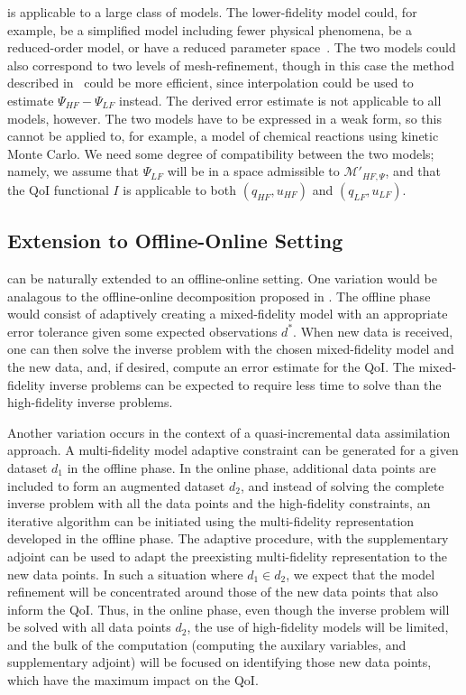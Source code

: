  is applicable to a large class of models. The lower-fidelity model could, for example, be a simplified model including fewer physical phenomena, be a reduced-order model, or have a reduced parameter space~\cite{thesis/SIAM talk?}. The two models could also correspond to two levels of mesh-refinement, though in this case the method described in~\cite{BecVex05} could be more efficient, since interpolation could be used to estimate $\Psi_{HF}-\Psi_{LF}$ instead. The derived error estimate is not applicable to all models, however. The two models have to be expressed in a weak form, so this cannot be applied to, for example, a model of chemical reactions using kinetic Monte Carlo. We need some degree of compatibility between the two models; namely, we assume that $\Psi_{LF}$ will be in a space admissible to $\mathcal{M}'_{HF,\Psi}$, and that the QoI functional $I$ is applicable to both $(q_{HF},u_{HF})$ and $(q_{LF},u_{LF})$.

\subsection{Extension to Offline-Online Setting}\label{sec:onoff}

 can be naturally extended to an offline-online setting. One variation would be analagous to the offline-online decomposition proposed in \cite{LiebWill13}. The offline phase would consist of adaptively creating a mixed-fidelity model with an appropriate error tolerance given some expected observations $d^*$. When new data is received, one can then solve the inverse problem with the chosen mixed-fidelity model and the new data, and, if desired, compute an error estimate for the QoI. The mixed-fidelity inverse problems can be expected to require less time to solve than the high-fidelity inverse problems.

Another variation occurs in the context of a quasi-incremental data assimilation approach. A multi-fidelity model adaptive constraint can be generated for a given dataset $d_1$ in the offline phase. In the online phase, additional data points are included to form an augmented dataset $d_2$, and instead of solving the complete inverse problem with all the data points and the high-fidelity constraints, an iterative algorithm can be initiated using the multi-fidelity representation developed in the offline phase. The adaptive procedure, with the supplementary adjoint can be used to adapt the preexisting multi-fidelity representation to the new data points. In such a situation where $d_1\in d_2$, we expect that the model refinement will be concentrated around those of the new data points that also inform the QoI. Thus, in the online phase, even though the inverse problem will be solved with all data points $d_2$, the use of high-fidelity models will be limited, and the bulk of the computation (computing the auxilary variables, and supplementary adjoint) will be focused on identifying those new data points, which have the maximum impact on the QoI.

